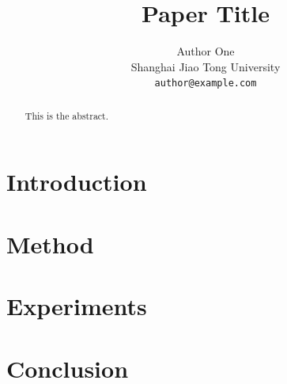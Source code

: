 \documentclass{article}
\title{Paper Title}
\author{%
  Author One\\
  Shanghai Jiao Tong University\\
  \texttt{author@example.com}
}
\begin{document}
\maketitle

\begin{abstract}
This is the abstract.
\end{abstract}

\section{Introduction}

\section{Method}

\section{Experiments}

\section{Conclusion}



\end{document}
